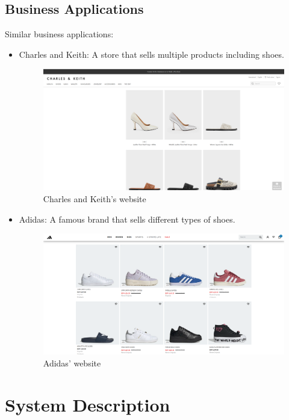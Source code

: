 \documentclass[12pt]{article}
\begin{document}
\subsection{Business Applications}
Similar business applications:
\begin{itemize}

\item
Charles and Keith: A store that sells multiple products including shoes.
 \begin{figure}[h]
\centering
\includegraphics[width=0.8\linewidth]{chK.png}
\caption{Charles and Keith's website}
\end{figure}
\end{itemize}
\newpage
\begin{itemize}
\item 
Adidas: A famous brand that sells different types of shoes.
 \begin{figure}[h]
\centering
\includegraphics[width=0.8\linewidth]{adidas.png}
\caption{Adidas' website}
\end{figure}

\end{itemize}

\section{System Description}
\end{document}
